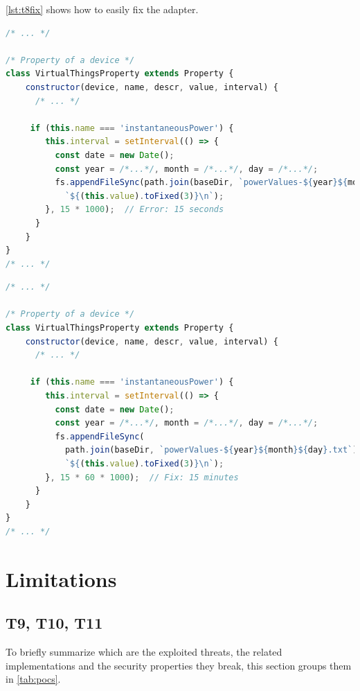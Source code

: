 \autoref{lst:t8fix} shows how to easily fix the adapter.

\begin{lstlisting}[language=JavaScript, label=lst:t8, caption=T8 - \texttt{instantaneousPower} memorization]
/* ... */

/* Property of a device */
class VirtualThingsProperty extends Property {
    constructor(device, name, descr, value, interval) {
      /* ... */
  
     if (this.name === 'instantaneousPower') {  
        this.interval = setInterval(() => {
          const date = new Date();
          const year = /*...*/, month = /*...*/, day = /*...*/;
          fs.appendFileSync(path.join(baseDir, `powerValues-${year}${month}${day}.txt`),
            `${(this.value).toFixed(3)}\n`);
        }, 15 * 1000);  // Error: 15 seconds    
      }
    }
}
/* ... */
\end{lstlisting}


\begin{lstlisting}[language=JavaScript, label=lst:t8fix, caption=T8 - \texttt{setInterval()} fix]
/* ... */

/* Property of a device */
class VirtualThingsProperty extends Property {
    constructor(device, name, descr, value, interval) {
      /* ... */
  
     if (this.name === 'instantaneousPower') {  
        this.interval = setInterval(() => {
          const date = new Date();
          const year = /*...*/, month = /*...*/, day = /*...*/;
          fs.appendFileSync(
            path.join(baseDir, `powerValues-${year}${month}${day}.txt`),
            `${(this.value).toFixed(3)}\n`);
        }, 15 * 60 * 1000);  // Fix: 15 minutes
      }
    }
}
/* ... */
\end{lstlisting}



\section{Limitations}

\subsection{T9, T10, T11}
\label{t91011poc}

To briefly summarize which are the exploited threats, the related implementations and the security properties they break, this section groups them in \autoref{tab:pocs}.

